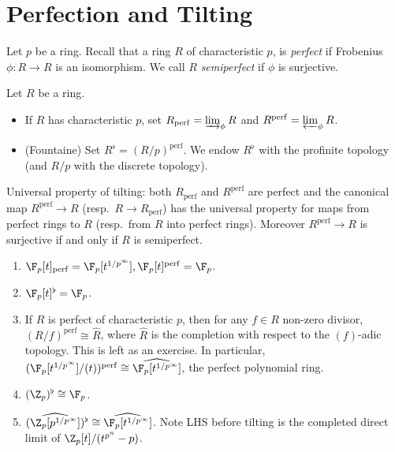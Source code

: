\documentclass[a4paper]{article}
\newcommand{\tilt}{\flat} %
\newcommand{\perf}{\mathrm{perf}}
\begin{document}


\tableofcontents

\section{Perfection and Tilting}

Let \(p\) be a ring. Recall that a ring \(R\) of characteristic \(p\), is \emph{perfect} if Frobenius \(\phi: R \to R\) is an isomorphism. We call \(R\) \emph{semiperfect} if \(\phi\) is surjective.

\begin{definition}[tilting]
  Let \(R\) be a ring.
  \begin{itemize}
  \item If \(R\) has characteristic \(p\), set \(R_\perf = \varinjlim_\phi R\) and \(R^\perf = \varprojlim_\phi R\).
  \item (Fountaine) Set \(R^\tilt = (R/p)^\perf\). We endow \(R^\tilt\) with the profinite topology (and \(R/p\) with the discrete topology).
  \end{itemize}
\end{definition}

\begin{remark}
  Universal property of tilting: both \(R_\perf\) and \(R^\perf\) are perfect and the canonical map \(R^\perf \to R\) (resp.\ \(R \to R_\perf\)) has the universal property for maps from perfect rings to \(R\) (resp.\ from \(R\) into perfect rings). Moreover \(R^{\mathrm{perf}} \to R\) is surjective if and only if \(R\) is semiperfect.
\end{remark}

\begin{eg}\leavevmode
  \begin{enumerate}
  \item \(\F_p[t]_\perf = \F_p[t^{1/p^\infty}], \F_p[t]^\perf = \F_p\).
  \item \(\F_p[t]^\tilt = \F_p\).
  \item If \(R\) is perfect of characteristic \(p\), then for any \(f \in R\) non-zero divisor, \((R/f)^\perf \cong \hat R\), where \(\hat R\) is the completion with respect to the \((f)\)-adic topology. This is left as an exercise. In particular, \((\F_p[t^{1/p^\infty}]/(t))^\perf \cong \widehat{\F_p[t^{1/p^\infty}]}\), the perfect polynomial ring.
  \item \((\Z_p)^\tilt \cong \F_p\).
  \item \((\widehat{\Z_p[p^{1/p^\infty}]})^\tilt \cong \widehat{\F_p[t^{1/p^\infty}]}\). Note LHS before tilting is the completed direct limit of \(\Z_p[t]/(t^{p^n} - p)\).
  \end{enumerate}
\end{eg}
\end{document}
